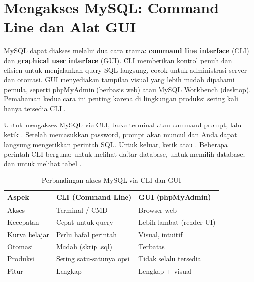 ﻿\section{Mengakses MySQL: Command Line dan Alat GUI}

MySQL dapat diakses melalui dua cara utama: \textbf{command line interface} (CLI) dan \textbf{graphical user interface} (GUI). CLI memberikan kontrol penuh dan efisien untuk menjalankan query SQL langsung, cocok untuk administrasi server dan otomasi. GUI menyediakan tampilan visual yang lebih mudah dipahami pemula, seperti phpMyAdmin (berbasis web) atau MySQL Workbench (desktop). Pemahaman kedua cara ini penting karena di lingkungan produksi sering kali hanya tersedia CLI \cite{mysqlDocs}.

Untuk mengakses MySQL via CLI, buka terminal atau command prompt, lalu ketik . Setelah memasukkan password, prompt  akan muncul dan Anda dapat langsung mengetikkan perintah SQL. Untuk keluar, ketik  atau \code{\\q}. Beberapa perintah CLI berguna:  untuk melihat daftar database,  untuk memilih database, dan  untuk melihat tabel \cite{mysqlGettingStarted}.

\begin{table}[H]
\centering
\begin{tabular}{|P{3cm}|P{5cm}|P{5cm}|}
\hline
\textbf{Aspek} & \textbf{CLI (Command Line)} & \textbf{GUI (phpMyAdmin)} \\
\hline
Akses & Terminal / CMD & Browser web \\
\hline
Kecepatan & Cepat untuk query & Lebih lambat (render UI) \\
\hline
Kurva belajar & Perlu hafal perintah & Visual, intuitif \\
\hline
Otomasi & Mudah (skrip .sql) & Terbatas \\
\hline
Produksi & Sering satu-satunya opsi & Tidak selalu tersedia \\
\hline
Fitur & Lengkap & Lengkap + visual \\
\hline
\end{tabular}
\caption{Perbandingan akses MySQL via CLI dan GUI}
\end{table}


